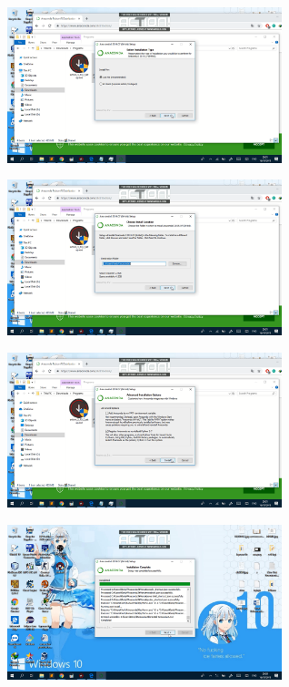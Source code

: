 \begin{figure}[H]
	\centering
	\includegraphics[width=8cm]{figures/4.png}
\end{figure}

\begin{figure}[H]
	\centering
	\includegraphics[width=8cm]{figures/5.png}
\end{figure}

\begin{figure}[H]
	\centering
	\includegraphics[width=8cm]{figures/6.png}
\end{figure}

\begin{figure}[H]
	\centering
	\includegraphics[width=8cm]{figures/7.png}
\end{figure}

